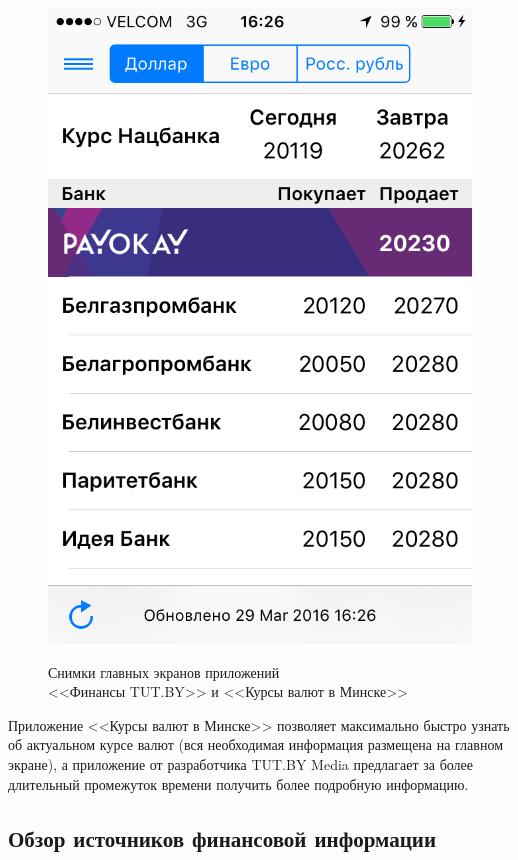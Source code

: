 \begin{figure} [h]
\begin{minipage} [h] {0.49\linewidth}
{      \includegraphics[width=0.9\linewidth]{fig/exchanges_minsk_screen}
      }
    \end{minipage}
  \caption{Снимки главных экранов приложений \\ <<Финансы TUT.BY>> и <<Курсы валют в Минске>>}
  \label{fig:tutby_exchanges_minsk_screenshots}
\end{figure}

Приложение <<Курсы валют в Минске>> позволяет максимально быстро узнать об актуальном
курсе валют (вся необходимая информация размещена на главном экране),
а приложение от разработчика TUT.BY Media предлагает за более
длительный промежуток времени получить более подробную информацию.



\subsection{Обзор источников финансовой информации}

